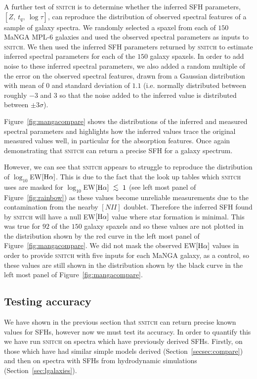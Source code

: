 \documentclass[useAMS,usenatbib]{mn2e}
\def\lesssim{\mathrel{\hbox{\rlap{\hbox{\lower3pt\hbox{$\sim$}}}\hbox{\raise2pt\hbox{$<$}}}}}
\begin{document}
A further test of \textsc{snitch} is to determine whether the inferred SFH parameters, $[Z,~t_q,~\log\tau]$, can reproduce the distribution of observed spectral features of a sample of galaxy spectra. We randomly selected a spaxel from each of $150$ MaNGA MPL-6 galaxies  and used the observed spectral parameters as inputs to \textsc{snitch}. We then used the inferred SFH parameters returned by \textsc{snitch} to estimate inferred spectral parameters for each of the $150$ galaxy spaxels. In order to add noise to these inferred spectral parameters, we also added a random multiple of the error on the observed spectral features, drawn from a Gaussian distribution with mean of $0$ and standard deviation of $1.1$ (i.e. normally distributed between roughly $-3$ and $3$ so that the noise added to the inferred value is distributed between $\pm3\sigma$).

Figure~\ref{fig:mangacompare} shows the distributions of the inferred and measured spectral parameters and highlights how the inferred values trace the original measured values well, in particular for the absorption features. Once again demonstrating that \textsc{snitch} can return a precise SFH for a galaxy spectrum. 

However, we can see that \textsc{snitch} appears to struggle to reproduce the distribution of $\log_{10}$EW$[\rm{H}\alpha]$. This is due to the fact that the look up tables which \textsc{snitch} uses are masked for $\log_{10}$EW$[\rm{H}\alpha]~\lesssim~1$ (see left most panel of Figure~\ref{fig:rainbow}) as these values become unreliable measurements due to the contamination from the nearby $[NII]$ doublet. Therefore the inferred SFH found by \textsc{snitch} will have a null EW$[\rm{H}\alpha]$ value where star formation is minimal. This was true for $92$ of the $150$ galaxy spaxels and so these values are not plotted in the distribution shown by the red curve in the left most panel of Figure~\ref{fig:mangacompare}. We did not mask the observed EW$[\rm{H}\alpha]$ values in order to provide \textsc{snitch} with five inputs for each MaNGA galaxy, as a control, so these values are still shown in the distribution shown by the black curve in the left most panel of Figure~\ref{fig:mangacompare}. 

\subsection{Testing accuracy}\label{sec:accuracytest}

We have shown in the previous section that \textsc{snitch} can return precise known values for SFHs, however now we must test its accuracy. In order to quantify this we have run \textsc{snitch} on spectra which have previously derived SFHs. Firstly, on those which have had similar simple models derived (Section~\ref{secsec:compare}) and then on spectra with SFHs from hydrodynamic simulations (Section~\ref{sec:lgalaxies}).
\end{document}
